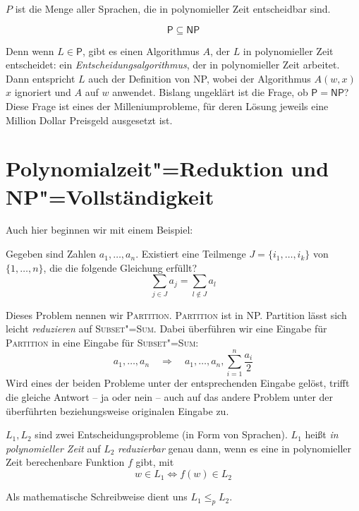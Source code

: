 \begin{Def}
  \hspace{\parindent}$P$ ist die Menge aller Sprachen, die in polynomieller Zeit entscheidbar sind.
\end{Def}

\begin{Anm}
  \[ \mathsf{P} \subseteq \mathsf{NP} \]
  
  Denn wenn $L \in \mathsf{P}$, gibt es einen Algorithmus $A$, der $L$ in polynomieller Zeit entscheidet: ein \textit{Entscheidungsalgorithmus}, der in polynomieller Zeit arbeitet. Dann entspricht $L$ auch der Definition von \textsf{NP}, wobei der Algorithmus $A(w,x)$ $x$ ignoriert und $A$ auf $w$ anwendet. Bislang ungeklärt ist die Frage, ob $\mathsf{P}=\mathsf{NP}$? Diese Frage ist eines der Milleniumprobleme, für deren Lösung jeweils eine Million Dollar Preisgeld ausgesetzt ist.
\end{Anm}

\section{Polynomialzeit"=Reduktion und NP"=Vollständigkeit}
Auch hier beginnen wir mit einem Beispiel:
\begin{Bsp}[Partition]
  \hspace{\parindent}Gegeben sind Zahlen $a_1, \ldots, a_n$. Existiert eine Teilmenge $J=\{i_1, \ldots, i_k\}$ von $\{1, \ldots, n\}$, die die folgende Gleichung erfüllt? \[ \sum_{j\in J}a_j = \sum_{l\notin J}a_l \]
  
  Dieses Problem nennen wir \textsc{Partition}. \textsc{Partition} ist in \textsf{NP}. Partition lässt sich leicht \textit{reduzieren} auf \textsc{Subset"=Sum}. Dabei überführen wir eine Eingabe für \textsc{Partition} in eine Eingabe für \textsc{Subset"=Sum}:
  \[ a_1, \ldots, a_n \quad \Rightarrow \quad a_1, \ldots, a_n, \sum_{i=1}^{n} \frac{a_i}{2} \]
   Wird eines der beiden Probleme unter der entsprechenden Eingabe gelöst, trifft die gleiche Antwort -- ja oder nein -- auch auf das andere Problem unter der überführten beziehungsweise originalen Eingabe zu.
\end{Bsp}

\begin{Def}[Polynomialzeit"=Reduktion]
  \hspace{\parindent}$L_1, L_2$ sind zwei Entscheidungsprobleme (in Form von Sprachen). $L_1$ heißt \textit{in polynomieller Zeit} auf $L_2$ \textit{reduzierbar} genau dann, wenn es eine in polynomieller Zeit berechenbare Funktion $f$ gibt, mit
  \[ w \in L_1 \Leftrightarrow f(w) \in L_2 \]
  
  Als mathematische Schreibweise dient uns $L_1 \le_p L_2$.
\end{Def}

